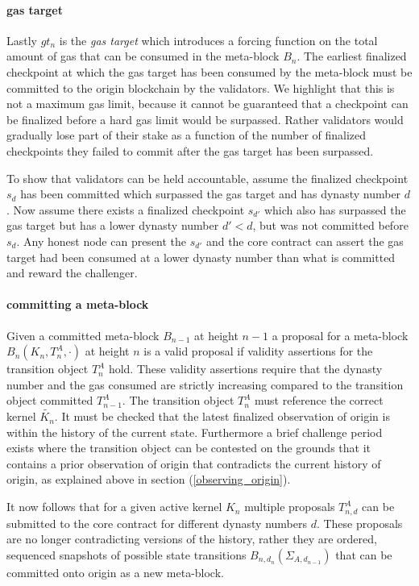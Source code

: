 \documentclass[12pt,a4paper]{article}
\begin{document}
\paragraph{gas target} Lastly $gt_n$ is the \emph{gas target} which introduces a forcing function on the total amount of gas that can be consumed in the meta-block $B_n$.
The earliest finalized checkpoint at which the gas target has been consumed by the meta-block must be committed to the origin blockchain by the validators.
We highlight that this is not a maximum gas limit, because it cannot be guaranteed that a checkpoint can be finalized before a hard gas limit would be surpassed. Rather validators would gradually lose part of their stake as a function of the number of finalized checkpoints they failed to commit after the gas target has been surpassed.

To show that validators can be held accountable, assume the finalized checkpoint $s_d$ has been committed which surpassed the gas target and has dynasty number $d$.
Now assume there exists a finalized checkpoint $s_{d'}$ which also has surpassed the gas target but has a lower dynasty number $d' < d$, but was not committed before $s_d$.
Any honest node can present the $s_{d'}$ and the core contract can assert the gas target had been consumed at a lower dynasty number than what is committed and reward the challenger.

\paragraph{committing a meta-block} Given a committed meta-block $B_{n-1}$ at height $n-1$ a proposal for a meta-block $B_{n}(K_{n}, T^A_{n}, \cdot)$ at height $n$ is a valid proposal if validity assertions for the transition object $T^A_n$ hold.  These validity assertions require that the dynasty number and the gas consumed are strictly increasing compared to the transition object committed $T^A_{n-1}$. The transition object $T^A_n$ must reference the correct kernel $\tilde{K_n}$. It must be checked that the latest finalized observation of origin is within the history of the current state. Furthermore  a brief challenge period exists where the transition object can be contested on the grounds that it contains a prior observation of origin that contradicts the current history of origin, as explained above in section (\ref{observing_origin}).

It now follows that for a given active kernel $K_n$ multiple proposals $T^{A}_{n,d}$ can be submitted to the core contract for different dynasty numbers $d$.  These proposals are no longer contradicting versions of the history, rather they are ordered, sequenced snapshots of possible state transitions $B_{n,d_{n}}(\Sigma_{A,d_{n-1}})$ that can be committed onto origin as a new meta-block.
\end{document}
